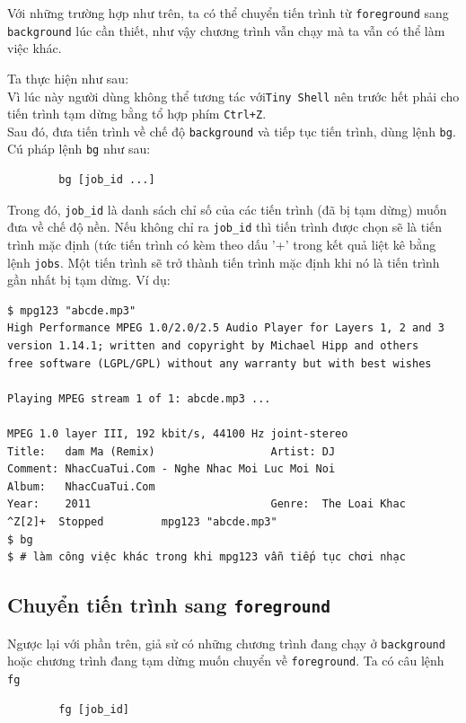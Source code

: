 \documentclass[a4paper,12pt]{report}
\begin{document}
	    Với những trường hợp như trên, ta có thể chuyển tiến trình từ
	    \texttt{foreground} sang \texttt{background} lúc cần thiết, như
	    vậy chương trình vẫn chạy mà ta vẫn có thể làm việc khác.
	
	
	    Ta thực hiện như sau:\\
	
	    Vì lúc này người dùng không thể tương tác với\texttt{Tiny
	    Shell} nên trước hết phải cho tiến trình tạm dừng bằng tổ hợp
	    phím \texttt{Ctrl+Z}.\\
	    Sau đó, đưa tiến trình về chế độ \texttt{background} và tiếp
	    tục tiến trình, dùng lệnh \texttt{bg}. Cú pháp lệnh \texttt{bg}
	    như sau:
	    \begin{verbatim}
	    bg [job_id ...]
	    \end{verbatim}
	    Trong đó, \texttt{job\_id} là danh sách chỉ số của các tiến
	    trình (đã bị tạm dừng) muốn đưa về chế độ nền. Nếu không chỉ ra
	    \texttt{job\_id} thì tiến trình được chọn sẽ là tiến trình mặc
	    định (tức tiến trình có kèm theo dấu '+' trong kết quả liệt kê
	    bằng lệnh \texttt{jobs}. Một tiến trình sẽ trở thành tiến trình
	    mặc định khi nó là tiến trình gần nhất bị tạm dừng. Ví dụ:
	    \begin{verbatim}
$ mpg123 "abcde.mp3"
High Performance MPEG 1.0/2.0/2.5 Audio Player for Layers 1, 2 and 3
version 1.14.1; written and copyright by Michael Hipp and others
free software (LGPL/GPL) without any warranty but with best wishes

Playing MPEG stream 1 of 1: abcde.mp3 ...

MPEG 1.0 layer III, 192 kbit/s, 44100 Hz joint-stereo
Title:   dam Ma (Remix)                  Artist: DJ
Comment: NhacCuaTui.Com - Nghe Nhac Moi Luc Moi Noi
Album:   NhacCuaTui.Com
Year:    2011                            Genre:  The Loai Khac
^Z[2]+  Stopped         mpg123 "abcde.mp3"
$ bg
$ # làm công việc khác trong khi mpg123 vẫn tiếp tục chơi nhạc
	    \end{verbatim}
	
	    \subsection{Chuyển tiến trình sang \texttt{foreground}}
	    Ngược lại với phần trên, giả sử có những chương trình đang chạy ở
	    \texttt{background} hoặc chương trình đang tạm dừng muốn chuyển về
	    \texttt{foreground}. Ta có câu lệnh \texttt{fg}
	    \begin{verbatim}
	    fg [job_id]
	    \end{verbatim}
	
\end{document}
